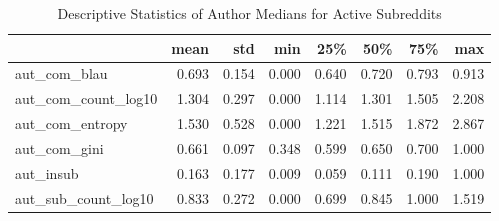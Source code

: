 \begin{table}
\centering
\begin{tabular}{lrrrrrrr}
\toprule
{} &  mean &   std &   min &   25\% &   50\% &   75\% &   max \\
\midrule
aut\_com\_blau        & 0.693 & 0.154 & 0.000 & 0.640 & 0.720 & 0.793 & 0.913 \\
aut\_com\_count\_log10 & 1.304 & 0.297 & 0.000 & 1.114 & 1.301 & 1.505 & 2.208 \\
aut\_com\_entropy     & 1.530 & 0.528 & 0.000 & 1.221 & 1.515 & 1.872 & 2.867 \\
aut\_com\_gini        & 0.661 & 0.097 & 0.348 & 0.599 & 0.650 & 0.700 & 1.000 \\
aut\_insub           & 0.163 & 0.177 & 0.009 & 0.059 & 0.111 & 0.190 & 1.000 \\
aut\_sub\_count\_log10 & 0.833 & 0.272 & 0.000 & 0.699 & 0.845 & 1.000 & 1.519 \\
\bottomrule
\end{tabular}
\caption{Descriptive Statistics of Author Medians for Active Subreddits}
\label{table/author-medians:active}
\end{table}